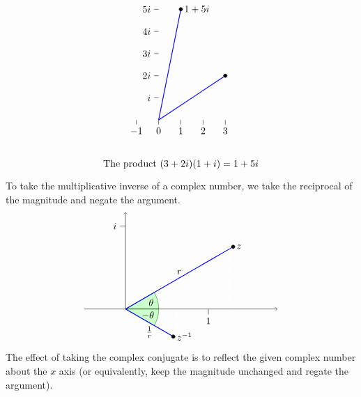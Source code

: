 \begin{equation*}
\begin{tikzpicture}[scale=0.8]
\begin{scope}[xshift=14cm]
      \draw(0,1) -- +(-0.2,0) node[left] {$i$};
      \draw(0,2) -- +(-0.2,0) node[left] {$2i$};
      \draw(0,3) -- +(-0.2,0) node[left] {$3i$};
      \draw(0,4) -- +(-0.2,0) node[left] {$4i$};
      \draw(0,5) -- +(-0.2,0) node[left] {$5i$};
      \draw(-1,0) -- +(0,-0.2) node[below] {$-1$};
      \draw(0,0) -- +(0,-0.2) node[below] {$0$};
      \draw(1,0) -- +(0,-0.2) node[below] {$1$};
      \draw(2,0) -- +(0,-0.2) node[below] {$2$};
      \draw(3,0) -- +(0,-0.2) node[below] {$3$};
      \draw[thick, blue] (0,0) -- (3,2);
      \draw[fill, black] (3,2) circle [radius=2.25pt];
      \draw[thick, blue] (0,0) -- (1,5);
      \draw[fill, black] (1,5) circle [radius=2.25pt] node [right] {$1+5i$};
      \draw (1,-2) node {The product $(3+2i)(1+i)=1+5i$};
    \end{scope}
  \end{tikzpicture}
\end{equation*}
To take the multiplicative inverse of a complex number, we take the
reciprocal of the magnitude and negate the argument. 
\begin{equation*}
  \begin{tikzpicture}
    \draw[help lines, dotted] (30:4.5) -- (30:4.5 |- 0,0);
    \draw[help lines, dotted] (-30:2) -- (-30:2 |- 0,0);
    \filldraw[fill=green!20,draw=green!50!black] (0,0) -- (1.2,0) arc (0:30:1.2) -- cycle;
    \filldraw[fill=green!20,draw=green!50!black] (0,0) -- (1.2,0) arc (0:-30:1.2) -- cycle;
    \node at (15:9mm){$~\theta$};
    \node at (-15:9mm){$-\theta~$};
    \draw[->](-1.5,0) -- (5.5,0);
    \draw[->](0,0) -- (0,3.5);
    \draw(0,3) -- +(-0.2,0) node[left] {$i$};
    \draw(3,0) -- +(0,-0.2) node[below] {$1$};
    \draw[thick, blue] (0,0) -- node[above, black] {$r$} (30:4.5);
    \draw[fill, black] (30:4.5) circle [radius=1.8pt] node [right] {$z$};
    \draw[thick, blue] (0,0) -- node[below, black] {$\frac{1}{r}$} (-30:2);
    \draw[fill, black] (-30:2) circle [radius=1.8pt] node [right] {$z^{-1}$};
  \end{tikzpicture}
\end{equation*}
The effect of taking the complex conjugate is to reflect the given
complex number about the $x$ axis (or equivalently, keep the magnitude
unchanged and regate the argument).
